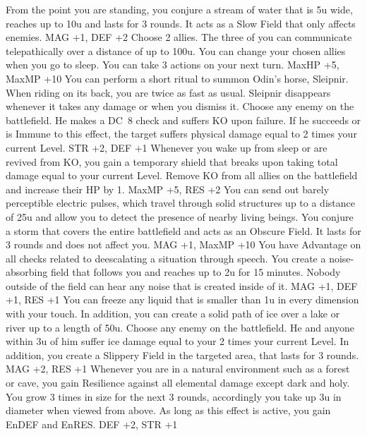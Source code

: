 {From the point you are standing, you conjure a stream of water that is 5u wide, reaches up to 10u and lasts for 3 rounds. It acts as a Slow Field that only affects enemies.}
{MAG +1, DEF +2}
%
\vfill
%
{Choose 2 allies. The three of you can communicate telepathically over a distance of up to 100u. You can change your chosen allies when you go to sleep.}
{You can take 3 actions on your next turn.}
{MaxHP +5, MaxMP +10}
%
\clearpage
%
{You can perform a short ritual to summon Odin's horse, Sleipnir. When riding on its back, you are twice as fast as usual. Sleipnir disappears whenever it takes any damage or when you dismiss it.}
{Choose any enemy on the battlefield. He makes a DC~8 check and suffers KO upon failure. If he succeeds or is Immune to this effect, the target suffers physical damage equal to 2 times your current Level.}
{STR +2, DEF +1}
%
\vfill
%
{Whenever you wake up from sleep or are revived from KO, you gain a temporary shield that breaks upon taking total damage equal to your current Level.}
{Remove KO from all allies on the battlefield and increase their HP by 1.}
{MaxMP +5, RES +2}
%
\vfill
%
{You can send out barely perceptible electric pulses, which travel through solid structures up to a distance of 25u and allow you to detect the presence of nearby living beings.}
{You conjure a storm  that covers the entire battlefield and acts as an Obscure Field. It lasts for 3 rounds and does not affect you.}
{MAG +1, MaxMP +10}
%
\vfill
%
{You have Advantage on all checks related to deescalating a situation through speech.}
{You create a noise-absorbing field that follows you and reaches up to 2u for 15 minutes. Nobody outside of the field can hear any noise that is created inside of it.}
{MAG +1, DEF +1, RES +1}
%
\vfill
%
{You can freeze any liquid that is smaller than 1u in every dimension with your touch. In addition, you can create a solid path of ice over a lake or river up to a length of 50u.}
{Choose any enemy on the battlefield. He and anyone within 3u of him suffer ice damage equal to your 2 times your current Level. In addition, you create a Slippery Field in the targeted area, that lasts for 3 rounds.}
{MAG +2, RES +1}
%
\vfill
%
{Whenever you are in a natural environment such as a forest or cave, you gain Resilience against all elemental damage except dark and holy.}
{You grow 3 times in size for the next 3 rounds, accordingly you take up 3u in diameter when viewed from above. As long as this effect is active, you gain EnDEF and EnRES.}
{DEF +2, STR +1}
%
\clearpage